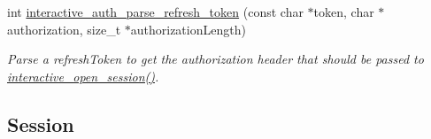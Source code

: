 \begin{DoxyCompactItemize}
\begin{DoxyCompactList}
{\ttfamily  }\end{DoxyCompactList}\item 
int \mbox{\hyperlink{group___interactivity_gaebcb6d12678db4826f74b36bf3cb9763}{interactive\+\_\+auth\+\_\+parse\+\_\+refresh\+\_\+token}} (const char $\ast$token, char $\ast$authorization, size\+\_\+t $\ast$authorization\+Length)
\begin{DoxyCompactList}\small\item\em Parse a {\ttfamily refresh\+Token} to get the authorization header that should be passed to {\ttfamily \mbox{\hyperlink{group___interactivity_ga18c778edf9cc8fe95bf143e3a6a55f6d}{interactive\+\_\+open\+\_\+session()}}}. \end{DoxyCompactList}\end{DoxyCompactItemize}
\subsection*{Session}
